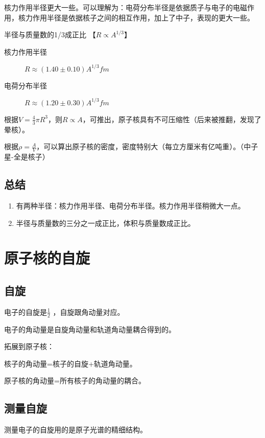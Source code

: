 核力作用半径更大一些。可以理解为：电荷分布半径是依据质子与电子的电磁作用，核力作用半径是依据核子之间的相互作用，加上了中子，表现的更大一些。

半径与质量数的1/3成正比 【$R\varpropto A^{1/3}$】

\begin{description}
    \item[核力作用半径] $R \approx (1.40\pm 0.10)A^{1/3}fm$ 
    \item[电荷分布半径] $R \approx (1.20\pm 0.30)A^{1/3}fm$ 
\end{description}

根据$V=\frac{4}{3} \pi R^{3}$，则$R\varpropto A$，可推出，原子核具有不可压缩性（后来被推翻，发现了晕核）。

根据$\rho = \frac{A}{V}$，可以算出原子核的密度，密度特别大（每立方厘米有亿吨重）。（中子星-全是核子）

\subsection{总结}

\begin{enumerate}
    \item 有两种半径：核力作用半径、电荷分布半径。核力作用半径稍微大一点。
    \item 半径与质量数的三分之一成正比，体积与质量数成正比。
\end{enumerate}

\section{原子核的自旋}

\subsection{自旋}

电子的自旋是$\frac{1}{2}$ ，自旋跟角动量对应。

电子的角动量是自旋角动量和轨道角动量耦合得到的。

拓展到原子核：

核子的角动量=核子的自旋+轨道角动量。

原子核的角动量=所有核子的角动量的耦合。

\subsection{测量自旋}

测量电子的自旋用的是原子光谱的精细结构。

